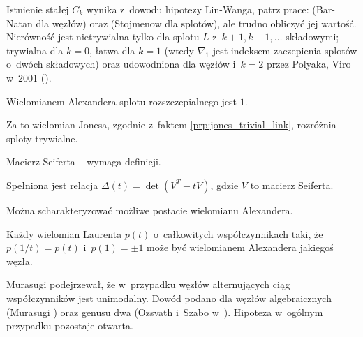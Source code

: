 Istnienie stałej $C_k$ wynika z~dowodu hipotezy Lin-Wanga, patrz prace: \cite{barnatan_95} (Bar-Natan dla węzłów) oraz \cite{stoimenow_01} (Stojmenow dla splotów), ale trudno obliczyć jej wartość.
Nierówność jest nietrywialna tylko dla splotu $L$ z~$k+1, k-1, \ldots$ składowymi; trywialna dla $k = 0$, łatwa dla $k=1$ (wtedy $\nabla_1$ jest indeksem zaczepienia splotów o~dwóch składowych) oraz udowodniona dla węzłów i~$k=2$ przez Polyaka, Viro w~2001 (\cite{polyak01}).

\begin{proposition}
	Wielomianem Alexandera splotu rozszczepialnego jest $1$.
\end{proposition}

Za to wielomian Jonesa, zgodnie z~faktem \ref{prp:jones_trivial_link}, rozróżnia sploty trywialne.

Macierz Seiferta -- wymaga definicji.
\begin{proposition}
	Spełniona jest relacja $\Delta(t)=\det(V^T-tV)$, gdzie $V$ to macierz Seiferta.
\end{proposition}

Można scharakteryzować możliwe postacie wielomianu Alexandera.

\begin{proposition}[Hosokowa, 1958]
	Każdy wielomian Laurenta $p(t)$ o~całkowitych współczynnikach taki, że $p(1/t) = p(t)$ i~$p(1) = \pm 1$ może być wielomianem Alexandera jakiegoś węzła.
\end{proposition}

Murasugi podejrzewał, że w~przypadku węzłów alternujących ciąg współczynników jest unimodalny.
Dowód podano dla węzłów algebraicznych (Murasugi \cite{murasugi85}) oraz genusu dwa (Ozsvath i~Szabo w~\cite{ozsvath03}).
Hipoteza w~ogólnym przypadku pozostaje otwarta.


